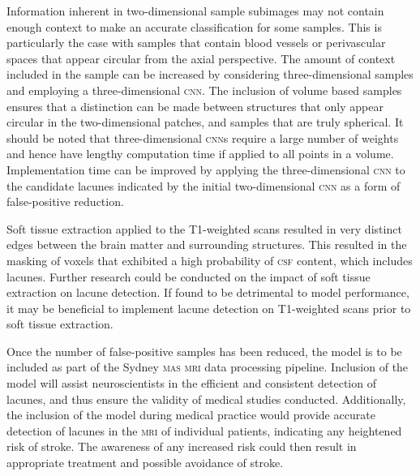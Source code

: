 Information inherent in two-dimensional sample subimages may not contain enough context to make an accurate classification for some samples. This is particularly the case with samples that contain blood vessels or perivascular spaces that appear circular from the axial perspective. The amount of context included in the sample can be increased by considering three-dimensional samples and employing a three-dimensional \textsc{cnn}. The inclusion of volume based samples ensures that a distinction can be made between structures that only appear circular in the two-dimensional patches, and samples that are truly spherical. It should be noted that three-dimensional \textsc{cnn}s require a large number of weights and hence have lengthy computation time if applied to all points in a volume. Implementation time can be improved by applying the three-dimensional \textsc{cnn} to the candidate lacunes indicated by the initial two-dimensional \textsc{cnn} as a form of false-positive reduction.

Soft tissue extraction applied to the T1-weighted scans resulted in very distinct edges between the brain matter and surrounding structures. This resulted in the masking of voxels that exhibited a high probability of \textsc{csf} content, which includes lacunes. Further research could be conducted on the impact of soft tissue extraction on lacune detection. If found to be detrimental to model performance, it may be beneficial to implement lacune detection on T1-weighted scans prior to soft tissue extraction.

Once the number of false-positive samples has been reduced, the model is to be included as part of the Sydney \textsc{mas} \textsc{mri} data processing pipeline. Inclusion of the model will assist neuroscientists in the efficient and consistent detection of lacunes, and thus ensure the validity of medical studies conducted. Additionally, the inclusion of the model during medical practice would provide accurate detection of lacunes in the \textsc{mri} of individual patients, indicating any heightened risk of stroke. The awareness of any increased risk could then result in appropriate treatment and possible avoidance of stroke.


 

%
%